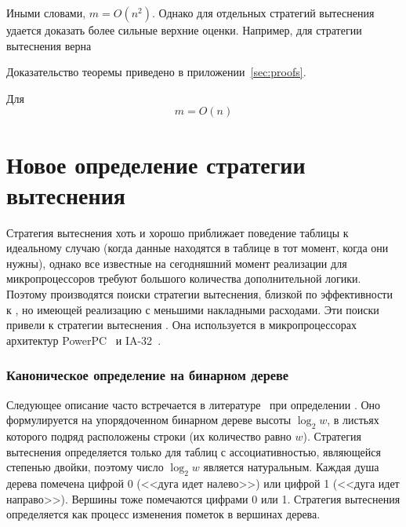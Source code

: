 \begin{enumerate}
Иными словами, $m = O(n^2)$. Однако для отдельных стратегий вытеснения удается доказать более сильные верхние оценки. Например, для стратегии вытеснения \LRU верна

\begin{theorem}\label{thm_mirror_lenth_lru} \UpperBoundLRUMirror
\end{theorem}
Доказательство теоремы приведено в приложении~\ref{sec:proofs}.
\begin{sld} Для \LRU
      $$m = O(n)$$
\end{sld}



\section{Новое определение стратегии вытеснения\\ \PseudoLRU}\label{sec:plru_new_definition}

Стратегия вытеснения \LRU хоть и хорошо приближает поведение
таблицы к идеальному случаю (когда данные находятся в
таблице в тот момент, когда они нужны), однако все известные на
сегодняшний момент реализации \LRU для микропроцессоров требуют большого
количества дополнительной логики. Поэтому производятся поиски
стратегии вытеснения, близкой по эффективности к \LRU, но имеющей
реализацию с меньшими накладными расходами. Эти поиски привели к
стратегии вытеснения \PseudoLRU. Она используется в микропроцессорах архитектур
PowerPC~\cite{PowerPC} и IA-32~\cite{FundamentalOfComputerOrganizationAndDesign}.

\subsubsection{Каноническое определение \PseudoLRU на бинарном дереве}

Следующее описание часто встречается в
литературе~\cite{FundamentalOfComputerOrganizationAndDesign} при
определении \PseudoLRU. Оно формулируется на
упорядоченном бинарном дереве высоты $\log_2 w$, в листьях которого
подряд расположены строки (их количество равно $w$). Стратегия вытеснения
\PseudoLRU определяется только для таблиц с ассоциативностью, являющейся степенью двойки, поэтому число $\log_2 w$ является натуральным. Каждая душа дерева помечена цифрой 0 (<<дуга идет налево>>) или цифрой 1 (<<дуга идет направо>>). Вершины тоже помечаются цифрами 0 или 1. Стратегия вытеснения определяется как процесс изменения пометок в вершинах дерева.


\end{enumerate}
